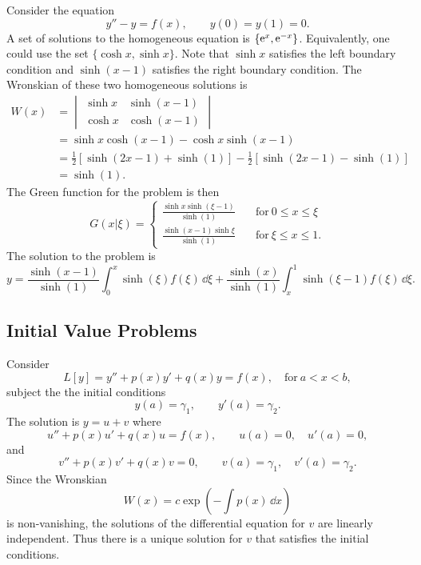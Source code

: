 \begin{Example}
  Consider the equation
  \[ 
  y'' - y = f(x), \qquad y(0) = y(1) = 0.
  \]
  A set of solutions to the homogeneous equation is $\{ \mathop{\mathrm{e}}\nolimits^x, \mathop{\mathrm{e}}\nolimits^{-x} \}$.  
  Equivalently, one could use the set $\{ \cosh x, \sinh x \}$.
  Note that $\sinh x$ satisfies the left boundary condition and $\sinh (x-1)$
  satisfies the right boundary condition.
  The Wronskian of these two homogeneous solutions is
  \begin{align*}
    W(x)    
    &= \begin{vmatrix}
      \sinh x         &       \sinh (x-1)     \\
      \cosh x         &       \cosh(x-1)
    \end{vmatrix} 
    \\
    &= \sinh x \cosh(x-1) - \cosh x \sinh(x-1) 
    \\
    &= \frac{1}{2} [\sinh (2x-1) + \sinh (1) ]
    - \frac{1}{2} [\sinh (2x-1) - \sinh(1)] 
    \\
    &= \sinh (1).
  \end{align*}
  The Green function for the problem is then
  \[ 
  \boxed{ 
    G(x|\xi) = 
    \begin{cases}
      \frac{\sinh x \sinh(\xi-1)}{\sinh(1)} \quad &\mathrm{for}\ 0 \leq x \leq \xi \\
      \frac{\sinh(x-1) \sinh \xi}{\sinh(1)} \quad &\mathrm{for}\ \xi \leq x \leq 1.
    \end{cases} 
    } 
  \]
  The solution to the problem is
  \[ 
  \boxed{ 
    y = \frac{\sinh(x-1)}{\sinh(1)} \int_0^x \sinh(\xi) f(\xi)\,\dd \xi
    + \frac{\sinh(x)}{\sinh(1)} \int_x^1 \sinh(\xi-1) f(\xi)\,\dd \xi . 
    } 
  \]
\end{Example}




















\subsection{Initial Value Problems}
Consider 
\[
L[y] = y'' + p(x) y' + q(x) y = f(x), \quad \mathrm{for}\ a < x < b,
\]
subject the the initial conditions
\[
y(a) = \gamma_1, \qquad y'(a) = \gamma_2.
\]
The solution is $y = u + v$ where
\[
u'' + p(x) u' + q(x) u = f(x), \qquad u(a) = 0, \quad u'(a) = 0,
\]
and
\[
v'' + p(x) v' + q(x) v = 0, \qquad v(a) = \gamma_1, \quad v'(a) = \gamma_2.
\]
Since the Wronskian
\[
W(x) = c \exp\left(-\int p(x)\,\dd x \right)
\]
is non-vanishing, the solutions of the differential equation for $v$ are 
linearly independent.  Thus there is a unique solution for $v$ that 
satisfies the initial conditions.

